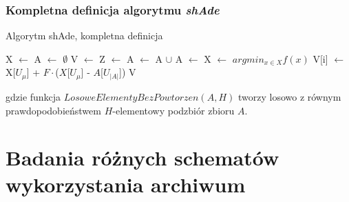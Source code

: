 \documentclass[12pt,a4paper]{report}
\begin{document}
{{{{{{{\subsection{Kompletna definicja algorytmu \emph{shAde}}
\begin{algorithm}[H]
\caption{Algorytm shAde, kompletna definicja}
\label{algorithm:shAde}
\begin{algorithmic}[1]
    \State X $\gets$ 
    \State A $\gets$ $\emptyset$
	    \State V $\gets$ 
        \State Z $\gets$ 
        \State A $\gets$ A $\cup$ 
	        \State A $\gets$ 
        \EndIf
        \State X $\gets$ 
    \EndWhile
    \State \Return $argmin_{x \in X} f(x)$
\EndFunction
\State
{}
	   	\State V[i] $\gets$ X[$U_\mu$] + $F \cdot $($X$[$U_\mu$] - $A$[$U_{|A|}$])
    \EndFor
    \State \Return V
\EndFunction
\end{algorithmic}
\end{algorithm}
gdzie funkcja $LosoweElementyBezPowtorzen(A, H)$ tworzy losowo z równym prawdopodobieństwem $H$-elementowy podzbiór zbioru $A$.

\chapter{Badania różnych schematów wykorzystania archiwum}
\label{badania}
}}}}}}}
\end{document}
